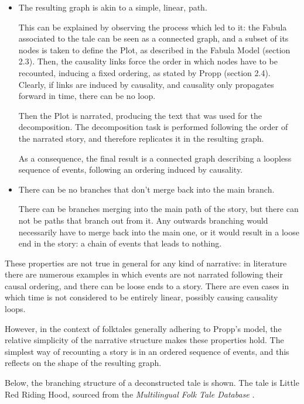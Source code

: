\documentclass[12pt,a4paper,oneside]{report}
\begin{document}
\begin{itemize}\setlength{\itemsep}{0pt}
\item The resulting graph is akin to a simple, linear, path. 

This can be explained by observing the process which led to it: the Fabula associated to the tale can be seen as a connected graph, and a subset of its nodes is taken to define the Plot, as described in the Fabula Model (section 2.3). Then, the causality links force the order in which nodes have to be recounted, inducing a fixed ordering, as stated by Propp (section 2.4). Clearly, if links are induced by causality, and causality only propagates forward in time, there can be no loop.

Then the Plot is narrated, producing the text that was used for the decomposition. The decomposition task is performed following the order of the narrated story, and therefore replicates it in the resulting graph.

As a consequence, the final result is a connected graph describing a loopless sequence of events, following an ordering induced by causality.

\item There can be no branches that don't merge back into the main branch.

There can be branches merging into the main path of the story, but there can not be paths that branch out from it. Any outwards branching would necessarily have to merge back into the main one, or it would result in a loose end in the story: a chain of events that leads to nothing.

\end{itemize}

\bigskip

These properties are not true in general for any kind of narrative: in literature there are numerous examples in which events are not narrated following their causal ordering, and there can be loose ends to a story. There are even cases in which time is not considered to be entirely linear, possibly causing causality loops.

However, in the context of folktales generally adhering to Propp's model, the relative simplicity of the narrative structure makes these properties hold. The simplest way of recounting a story is in an ordered sequence of events, and this reflects on the shape of the resulting graph.

\bigskip

Below, the branching structure of a deconstructed tale is shown. The tale is Little Red Riding Hood, sourced from the \textit{Multilingual Folk Tale Database} \cite{mdb}.
\end{document}
